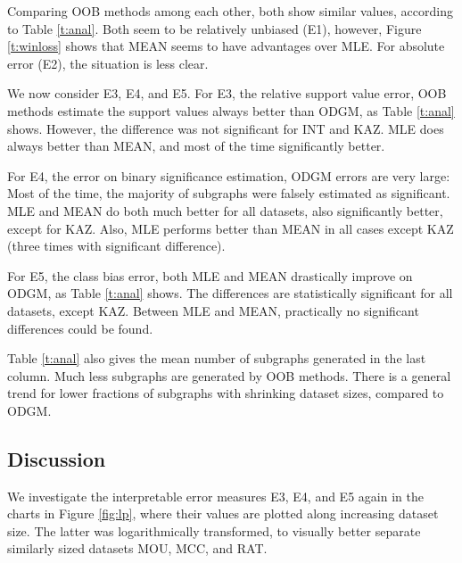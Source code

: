 \documentclass{sig-alternate}
\begin{document}
Comparing OOB methods among each other, both show
similar values, according to Table \ref{t:anal}. Both seem to be relatively
unbiased (E1), however, Figure \ref{t:winloss} shows that MEAN seems to have
advantages over MLE. For absolute error (E2), the situation is less clear. 

We now consider E3, E4, and E5. 
For E3, the relative support value error,
OOB methods estimate the support values always better than ODGM, as Table \ref{t:anal} shows. However, the difference was not significant for INT and KAZ.
MLE does always better than MEAN, and most of the time significantly better.

For E4, the error on binary significance estimation, ODGM errors are very large:
Most of the time, the majority of subgraphs were falsely estimated as significant. 
MLE and MEAN do both much better for all datasets, also significantly better, except for KAZ. 
Also, MLE performs better than MEAN in
all cases except KAZ (three times with significant difference). 

For E5, the class bias error, both MLE and MEAN drastically improve on ODGM, as
Table \ref{t:anal} shows. The differences
are statistically significant for all datasets, except KAZ. Between MLE and MEAN, practically no significant differences could be found.

Table \ref{t:anal} also gives the mean number of subgraphs generated in the
last column. Much less subgraphs are generated by OOB methods. 
There is a general trend for lower fractions of subgraphs
with shrinking dataset sizes, compared to ODGM. 

\subsection{Discussion}

We investigate the interpretable error measures E3, E4, and E5 again in
the charts in Figure \ref{fig:lp}, where their values are plotted along
increasing dataset size. The latter was logarithmically transformed, to
visually better separate similarly sized datasets MOU, MCC, and RAT. 
\end{document}
